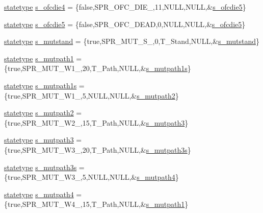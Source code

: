 \begin{DoxyCompactItemize}
\item 
\hyperlink{structstatestruct}{statetype} \hyperlink{WL__ACT2_8C_abf176bf01baaa0866bb02f9c0a3b8da8}{s\_\-ofcdie4} = \{false,SPR\_\-OFC\_\-DIE\_,11,NULL,NULL,\&\hyperlink{WL__ACT2_8C_a7927a2719c846f03fc74f6c1efddacf4}{s\_\-ofcdie5}\}
\item 
\hyperlink{structstatestruct}{statetype} \hyperlink{WL__ACT2_8C_a7927a2719c846f03fc74f6c1efddacf4}{s\_\-ofcdie5} = \{false,SPR\_\-OFC\_\-DEAD,0,NULL,NULL,\&\hyperlink{WL__ACT2_8C_a7927a2719c846f03fc74f6c1efddacf4}{s\_\-ofcdie5}\}
\item 
\hyperlink{structstatestruct}{statetype} \hyperlink{WL__ACT2_8C_a5d0acd2bcbf9de6e39650dd74e3a46d7}{s\_\-mutstand} = \{true,SPR\_\-MUT\_\-S\_,0,T\_\-Stand,NULL,\&\hyperlink{WL__ACT2_8C_a5d0acd2bcbf9de6e39650dd74e3a46d7}{s\_\-mutstand}\}
\item 
\hyperlink{structstatestruct}{statetype} \hyperlink{WL__ACT2_8C_ab650793c2a14497fdd52c90a54914ee0}{s\_\-mutpath1} = \{true,SPR\_\-MUT\_\-W1\_,20,T\_\-Path,NULL,\&\hyperlink{WL__ACT2_8C_acec161e60cabb60fce7ca7bb19cb6fb9}{s\_\-mutpath1s}\}
\item 
\hyperlink{structstatestruct}{statetype} \hyperlink{WL__ACT2_8C_acec161e60cabb60fce7ca7bb19cb6fb9}{s\_\-mutpath1s} = \{true,SPR\_\-MUT\_\-W1\_,5,NULL,NULL,\&\hyperlink{WL__ACT2_8C_af610cb2b216ab203c797b7230502fb2e}{s\_\-mutpath2}\}
\item 
\hyperlink{structstatestruct}{statetype} \hyperlink{WL__ACT2_8C_af610cb2b216ab203c797b7230502fb2e}{s\_\-mutpath2} = \{true,SPR\_\-MUT\_\-W2\_,15,T\_\-Path,NULL,\&\hyperlink{WL__ACT2_8C_aeeaa2d6e4b0038b7a5a1b87bc4bb59da}{s\_\-mutpath3}\}
\item 
\hyperlink{structstatestruct}{statetype} \hyperlink{WL__ACT2_8C_aeeaa2d6e4b0038b7a5a1b87bc4bb59da}{s\_\-mutpath3} = \{true,SPR\_\-MUT\_\-W3\_,20,T\_\-Path,NULL,\&\hyperlink{WL__ACT2_8C_a593ce82891d2271526db38adcd0780f5}{s\_\-mutpath3s}\}
\item 
\hyperlink{structstatestruct}{statetype} \hyperlink{WL__ACT2_8C_a593ce82891d2271526db38adcd0780f5}{s\_\-mutpath3s} = \{true,SPR\_\-MUT\_\-W3\_,5,NULL,NULL,\&\hyperlink{WL__ACT2_8C_a6fd0b4456ed6486482e1de8cd32746b1}{s\_\-mutpath4}\}
\item 
\hyperlink{structstatestruct}{statetype} \hyperlink{WL__ACT2_8C_a6fd0b4456ed6486482e1de8cd32746b1}{s\_\-mutpath4} = \{true,SPR\_\-MUT\_\-W4\_,15,T\_\-Path,NULL,\&\hyperlink{WL__ACT2_8C_ab650793c2a14497fdd52c90a54914ee0}{s\_\-mutpath1}\}
\item 

\end{DoxyCompactItemize}
